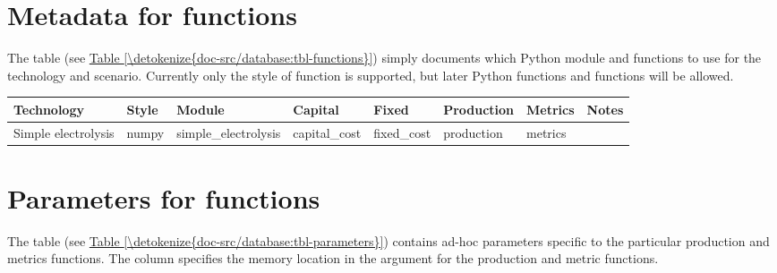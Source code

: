 \documentclass[letterpaper,10pt,english]{sphinxmanual}
\begin{document}
\section{Metadata for functions}
\label{\detokenize{doc-src/database:metadata-for-functions}}
The  table (see \hyperref[\detokenize{doc-src/database:tbl-functions}]{Table \ref{\detokenize{doc-src/database:tbl-functions}}}) simply documents which
Python module and functions to use for the technology and scenario.
Currently only the  style of function is supported, but later
 Python functions and  functions will be allowed.


\begin{savenotes}\sphinxattablestart
\centering
{}
\sphinxthecaptionisattop
{}\label{\detokenize{doc-src/database:table-3}}\label{\detokenize{doc-src/database:tbl-functions}}
\sphinxaftertopcaption
\begin{tabulary}{\linewidth}[t]{|T|T|T|T|T|T|T|T|}
\hline
\sphinxstyletheadfamily 
Technology
&\sphinxstyletheadfamily 
Style
&\sphinxstyletheadfamily 
Module
&\sphinxstyletheadfamily 
Capital
&\sphinxstyletheadfamily 
Fixed
&\sphinxstyletheadfamily 
Production
&\sphinxstyletheadfamily 
Metrics
&\sphinxstyletheadfamily 
Notes
\\
\hline
Simple electrolysis
&
numpy
&
simple\_electrolysis
&
capital\_cost
&
fixed\_cost
&
production
&
metrics
&\\
\hline
\end{tabulary}
\par
\sphinxattableend\end{savenotes}


\section{Parameters for functions}
\label{\detokenize{doc-src/database:parameters-for-functions}}
The  table (see \hyperref[\detokenize{doc-src/database:tbl-parameters}]{Table \ref{\detokenize{doc-src/database:tbl-parameters}}}) contains ad-hoc
parameters specific to the particular production and metrics functions.
The  column specifies the memory location in the argument for
the production and metric functions.
\end{document}
